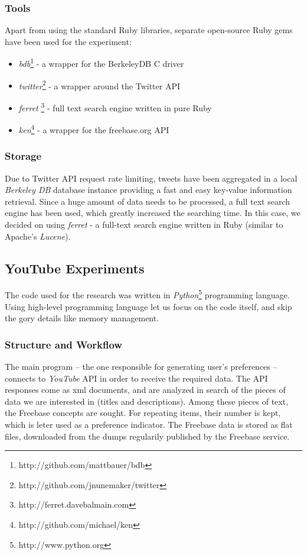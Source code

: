 \subsubsection{Tools}
Apart from using the standard Ruby libraries, separate open-source Ruby gems have been used for the experiment:
\begin{itemize}
  \item \textit{bdb}\footnote{http://github.com/mattbauer/bdb} - a wrapper for the BerkeleyDB C driver
  \item \textit{twitter}\footnote{http://github.com/jnunemaker/twitter} - a wrapper around the Twitter API
  \item \textit{ferret} \footnote{http://ferret.davebalmain.com} - full text search engine written in pure Ruby
  \item \textit{ken}\footnote{http://github.com/michael/ken} - a wrapper for the freebase.org API
\end{itemize}

\subsubsection{Storage}
Due to Twitter API request rate limiting, tweets have been aggregated in a local
\textit{Berkeley DB} database instance providing a fast and easy key-value
information retrieval. Since a huge amount of data needs to be processed, a full
text search engine has been used, which greatly increased the searching time. In
this case, we decided on using \textit{ferret} - a full-text search engine
written in Ruby (similar to Apache's \textit{Lucene}).

\subsection{YouTube Experiments}
The code used for the research was written in \textit{Python}\footnote{http://www.python.org}
programming language. Using high-level programming language let us focus on the code itself, and skip the
gory details like memory management.

\subsubsection{Structure and Workflow}
The main program -- the one responsible for generating user's preferences
-- connects to \textit{YouTube} API in order to receive the required data. The
API responses come as xml documents, and are analyzed in search of the pieces of
data we are interested in (titles and descriptions). Among these pieces of text,
the Freebase concepts are sought. For repeating items, their number is kept,
which is leter used as a preference indicator.  The Freebase data
is stored as flat files, downloaded from the dumps regularily published by the
Freebase service.

